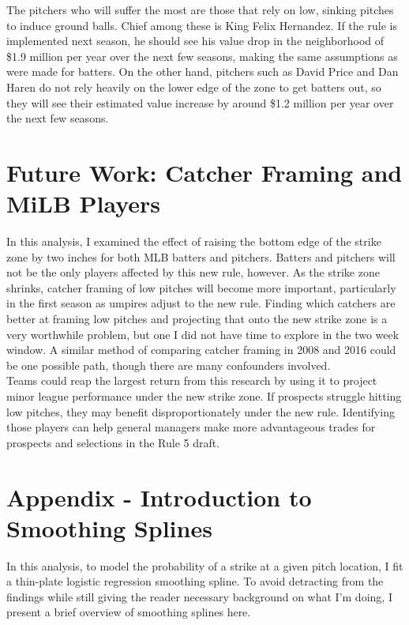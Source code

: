 \documentclass[11pt]{article}
\begin{document}
The pitchers who will suffer the most are those that rely on low, sinking pitches to induce ground balls.  Chief among these is King Felix Hernandez.  If the rule is implemented next season, he should see his value drop in the neighborhood of \$1.9 million per year over the next few seasons, making the same assumptions as were made for batters.  On the other hand, pitchers such as David Price and Dan Haren do not rely heavily on the lower edge of the zone to get batters out, so they will see their estimated value increase by around \$1.2 million per year over the next few seasons.  

\section{Future Work: Catcher Framing and MiLB Players}
In this analysis, I examined the effect of raising the bottom edge of the strike zone by two inches for both MLB batters and pitchers.  Batters and pitchers will not be the only players affected by this new rule, however.  As the strike zone shrinks, catcher framing of low pitches will become more important, particularly in the first season as umpires adjust to the new rule.  Finding which catchers are better at framing low pitches and projecting that onto the new strike zone is a very worthwhile problem, but one I did not have time to explore in the two week window.   A similar method of comparing catcher framing in 2008 and 2016 could be one possible path, though there are many confounders involved.\\

Teams could reap the largest return from this research by using it to project minor league performance under the new strike zone.  If prospects struggle hitting low pitches, they may benefit disproportionately under the new rule.  Identifying those players can help general managers make more advantageous trades for prospects and selections in the Rule 5 draft.

\section{Appendix - Introduction to Smoothing Splines}
In this analysis, to model the probability of a strike at a given pitch location, I fit a thin-plate logistic regression smoothing spline.  To avoid detracting from the findings while still giving the reader necessary background on what I'm doing, I present a brief overview of smoothing splines here.\\
\end{document}
